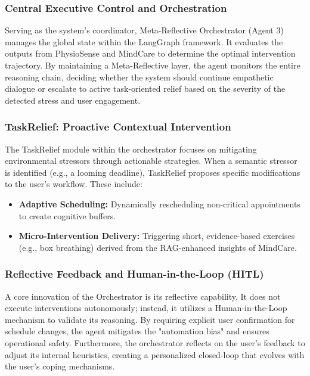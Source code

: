\documentclass[journal,twoside,web]{ieeecolor}
\begin{document}
\subsubsection{Central Executive Control and Orchestration}
Serving as the system's coordinator, Meta-Reflective Orchestrator (Agent 3) manages the global state within the LangGraph framework. It evaluates the outputs from PhysioSense and MindCare to determine the optimal intervention trajectory. By maintaining a Meta-Reflective layer, the agent monitors the entire reasoning chain, deciding whether the system should continue empathetic dialogue or escalate to active task-oriented relief based on the severity of the detected stress and user engagement.

\subsubsection{TaskRelief: Proactive Contextual Intervention}
The TaskRelief module within the orchestrator focuses on mitigating environmental stressors through actionable strategies. When a semantic stressor is identified (e.g., a looming deadline), TaskRelief proposes specific modifications to the user's workflow. These include:
\begin{itemize}
    \item \textbf{Adaptive Scheduling:} Dynamically rescheduling non-critical appointments to create cognitive buffers.
    \item \textbf{Micro-Intervention Delivery:} Triggering short, evidence-based exercises (e.g., box breathing) derived from the RAG-enhanced insights of MindCare.
\end{itemize}

\subsubsection{Reflective Feedback and Human-in-the-Loop (HITL)}
A core innovation of the Orchestrator is its reflective capability. It does not execute interventions autonomously; instead, it utilizes a Human-in-the-Loop mechanism to validate its reasoning. By requiring explicit user confirmation for schedule changes, the agent mitigates the "automation bias" and ensures operational safety. Furthermore, the orchestrator reflects on the user's feedback to adjust its internal heuristics, creating a personalized closed-loop that evolves with the user's coping mechanisms.
\end{document}
